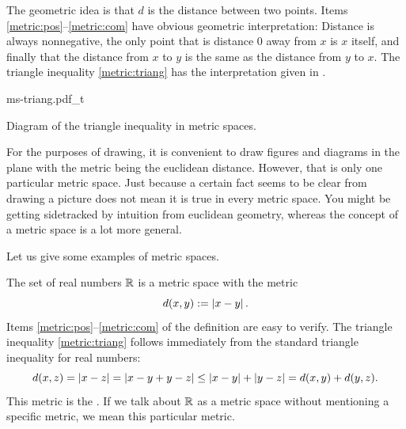 The geometric idea is that $d$ is the distance between two points. 
Items \ref{metric:pos}--\ref{metric:com} have obvious geometric
interpretation: Distance is always nonnegative, the only point that is
distance 0 away from $x$ is $x$ itself, and finally that the distance from
$x$ to $y$ is the same as the distance from $y$ to $x$.  The triangle
inequality \ref{metric:triang} has the interpretation given in
.
\begin{myfigureht}
{ms-triang.pdf_t}
\caption{Diagram of the triangle inequality in metric spaces.\label{fig:mstriang}}
\end{myfigureht}

For the purposes of drawing, it is convenient to draw figures and
diagrams in the plane with the metric being the euclidean distance.
However, that is only one particular metric space.  Just because a
certain fact seems to be clear from drawing a picture does not mean it is
true in every metric space.
You might be getting sidetracked by intuition from euclidean geometry,
whereas the concept of a metric space is a lot more general.

Let us give some examples of metric spaces.

\begin{example}
The set of real numbers ${\mathbb{R}}$ is a metric space with the metric
\begin{equation*}
d(x,y) := \left\lvert {x-y} \right\rvert .
\end{equation*}
Items \ref{metric:pos}--\ref{metric:com} of the definition
are easy to verify.  The
triangle inequality \ref{metric:triang} follows immediately
from the standard triangle inequality for real numbers:
\begin{equation*}
d(x,z) = \left\lvert {x-z} \right\rvert = 
\left\lvert {x-y+y-z} \right\rvert \leq
\left\lvert {x-y} \right\rvert+\left\lvert {y-z} \right\rvert =
d(x,y)+ d(y,z) .
\end{equation*}
This metric is the \emph{}.  If we talk
about ${\mathbb{R}}$ as a metric space without mentioning a specific metric, we 
mean this particular metric.
\end{example}

